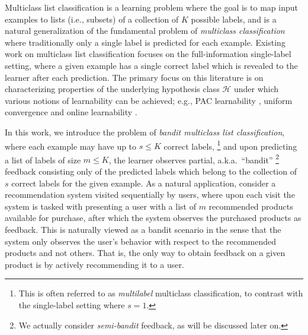 \documentclass[11pt]{article}
\newcommand{\tk}[1]{\textcolor{magenta}{\bf \{TK: #1\}}}
\newcommand{\calH}{\mathcal{H}}
\theoremstyle{plain}
\begin{document}
Multiclass list classification is a learning problem where the goal is to map input examples to lists (i.e., subsets) of a collection of $K$ possible labels, and is a natural generalization of the fundamental problem of \emph{multiclass classification} where traditionally only a single label is predicted for each example. 
Existing work on multiclass list classification focuses on the full-information single-label setting, where a given example has a single correct label which is revealed to the learner after each prediction. The primary focus on this literature is on characterizing properties of the underlying hypothesis class $\calH$ under which various notions of learnability can be achieved; e.g., PAC learnability \citep{charikar2023characterization}, uniform convergence \citep{hanneke2024list} and online learnability \citep{moran2023list}.

In this work, we introduce the problem of \emph{bandit multiclass list classification}, where each example may have up to $s \leq K$ correct labels,%
\footnote{This is often referred to as \emph{multilabel} multiclass classification, to contrast with the single-label setting where $s=1$.} and upon predicting a list of labels of size $m \leq K$, the learner observes partial, a.k.a.\ ``bandit''%
\footnote{We actually consider \emph{semi-bandit} feedback, as will be discussed later on.}  feedback consisting only of 
the predicted labels which belong to the collection of $s$ correct labels for the given example. As a natural application, consider a recommendation system visited sequentially by users, where upon each visit the system is tasked with presenting a user with a list of $m$ recommended products available for purchase, after which the system observes the purchased products as feedback. This is naturally viewed as a bandit scenario in the sense that the system only observes the user's behavior with respect to the recommended products and not others. That is, the only way to obtain feedback on a given product is by actively recommending it to a user.
\end{document}
